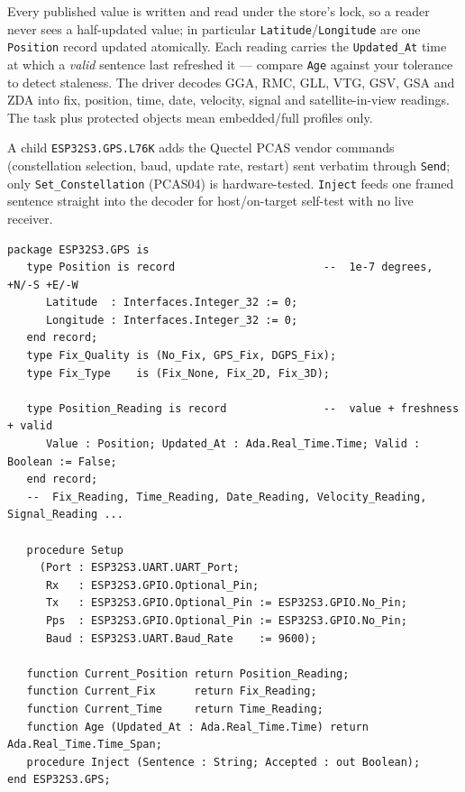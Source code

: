 Every published value is written and read under the store's lock, so a reader never
sees a half-updated value; in particular \texttt{Latitude}/\texttt{Longitude} are
one \texttt{Position} record updated atomically. Each reading carries the
\texttt{Updated\_At} time at which a \emph{valid} sentence last refreshed it ---
compare \texttt{Age} against your tolerance to detect staleness. The driver decodes
GGA, RMC, GLL, VTG, GSV, GSA and ZDA into fix, position, time, date, velocity,
signal and satellite-in-view readings. The task plus protected objects mean
embedded/full profiles only.


A child \texttt{ESP32S3.GPS.L76K} adds the Quectel PCAS vendor commands
(constellation selection, baud, update rate, restart) sent verbatim through
\texttt{Send}; only \texttt{Set\_Constellation} (PCAS04) is hardware-tested.
\texttt{Inject} feeds one framed sentence straight into the decoder for
host/on-target self-test with no live receiver.

\begin{lstlisting}
package ESP32S3.GPS is
   type Position is record                       --  1e-7 degrees, +N/-S +E/-W
      Latitude  : Interfaces.Integer_32 := 0;
      Longitude : Interfaces.Integer_32 := 0;
   end record;
   type Fix_Quality is (No_Fix, GPS_Fix, DGPS_Fix);
   type Fix_Type    is (Fix_None, Fix_2D, Fix_3D);

   type Position_Reading is record               --  value + freshness + valid
      Value : Position; Updated_At : Ada.Real_Time.Time; Valid : Boolean := False;
   end record;
   --  Fix_Reading, Time_Reading, Date_Reading, Velocity_Reading, Signal_Reading ...

   procedure Setup
     (Port : ESP32S3.UART.UART_Port;
      Rx   : ESP32S3.GPIO.Optional_Pin;
      Tx   : ESP32S3.GPIO.Optional_Pin := ESP32S3.GPIO.No_Pin;
      Pps  : ESP32S3.GPIO.Optional_Pin := ESP32S3.GPIO.No_Pin;
      Baud : ESP32S3.UART.Baud_Rate    := 9600);

   function Current_Position return Position_Reading;
   function Current_Fix      return Fix_Reading;
   function Current_Time     return Time_Reading;
   function Age (Updated_At : Ada.Real_Time.Time) return Ada.Real_Time.Time_Span;
   procedure Inject (Sentence : String; Accepted : out Boolean);
end ESP32S3.GPS;
\end{lstlisting}

